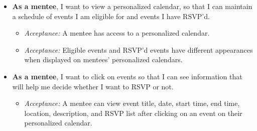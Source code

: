 \begin{itemize}[leftmargin=*, label=$\square$]
    \item \textbf{As a mentee}, I want to view a personalized calendar, so that
    I can maintain a schedule of events I am eligible for and events I have
    RSVP'd.
    \begin{itemize}[label=$\circ$, nosep]
        \item \textit{Acceptance:} A mentee has access to a personalized
        calendar.
        \item \textit{Acceptance:} Eligible events and RSVP'd events have
        different appearances when displayed on mentees' personalized calendars.
    \end{itemize}

    \item \textbf{As a mentee}, I want to click on events so that I can see
    information that will help me decide whether I want to RSVP or not.
    \begin{itemize}[label=$\circ$, nosep]
        \item \textit{Acceptance:} A mentee can view event title, date, start
        time, end time, location, description, and RSVP list after clicking on
        an event on their personalized calendar.
    \end{itemize}
\end{itemize}
